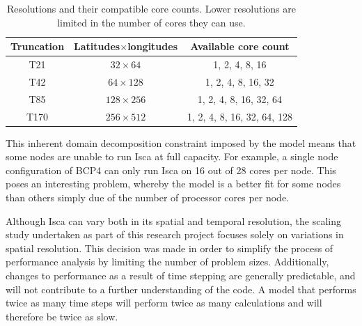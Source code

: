 \documentclass[a4paper,11pt]{report}
\begin{document}
\begin{table}[htbp]
\caption[Resolutions and their compatible core counts]{Resolutions and their compatible core counts. Lower resolutions are limited in the number of cores they can use.}
\begin{center}
\begin{tabular}{ c c c }
\toprule
Truncation 	& Latitudes$\times$longitudes 		& Available core count \\\midrule
 T21 			& $32\times64$					& 1, 2, 4, 8, 16 \\  
 T42 			& $64\times128$				& 1, 2, 4, 8, 16, 32 \\
 T85 			& $128\times256$ 				& 1, 2, 4, 8, 16, 32, 64 \\
 T170 		& $256\times512$ 				& 1, 2, 4, 8, 16, 32, 64, 128    \\\bottomrule
\end{tabular}
\label{tbl:resolutions}
\end{center}
\end{table}
\par
This inherent domain decomposition constraint imposed by the model means that some nodes are unable to run Isca at full capacity. For example, a single node configuration of BCP4 can only run  Isca on 16 out of 28 cores per node. This poses an interesting problem, whereby the model is a better fit for some nodes than others simply due of the number of processor cores per node. 
\par
Although Isca can vary both in its spatial and temporal resolution, the scaling study undertaken as part of this research project focuses solely on variations in spatial resolution. This decision was made in order to simplify the process of performance analysis by limiting the number of problem sizes. Additionally, changes to performance as a result of time stepping are generally predictable, and will not contribute to a further understanding of the code. A model that performs twice as many time steps will perform twice as many calculations and will therefore be twice as slow. 
\end{document}
